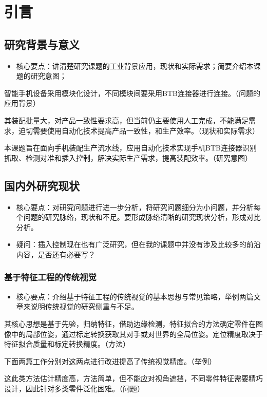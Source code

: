 \documentclass{Diploma}
\begin{document}
\chapter[preface]{引言}
\section{研究背景与意义}
\begin{itemize}
  \item 核心要点：讲清楚研究课题的工业背景应用，现状和实际需求；简要介绍本课题的研究意图；
\end{itemize}

智能手机设备采用模块化设计，不同模块间要采用BTB连接器进行连接。（问题的应用背景）

其装配批量大，对产品一致性要求高，但当前仍主要使用人工完成，不能满足需求，迫切需要使用自动化技术提高产品一致性，和生产效率。（现状和实际需求）

本课题旨在面向手机装配生产流水线，应用自动化技术实现手机BTB连接器识别抓取、检测对准和插入控制，解决实际生产需求，提高装配效率。（研究意图）
\section{国内外研究现状}
\begin{itemize}
  \item 核心要点：对研究问题进行进一步分析，将研究问题细分为小问题，并分析每个问题的研究脉络，现状和不足。要形成脉络清晰的研究现状分析，形成对比分析。
  \item 疑问：插入控制现在也有广泛研究，但在我的课题中并没有涉及比较多的前沿内容，是否还有必要写？
\end{itemize}
\subsection{基于特征工程的传统视觉}
\begin{itemize}
  \item 核心要点：介绍基于特征工程的传统视觉的基本思想与常见策略，举例两篇文章来说明传统视觉的研究侧重与不足。
\end{itemize}

其核心思想是基于先验，归纳特征，借助边缘检测，特征拟合的方法确定零件在图像中的局部位姿，通过标定转换获取其对手或对世界的全局位姿。定位精度取决于特征拟合质量和标定转换精度。（方法）

下面两篇工作分别对这两点进行改进提高了传统视觉精度。（举例）

这此类方法估计精度高，方法简单，但不能应对视角遮挡，不同零件特征需要精巧设计，因此针对多类零件泛化困难。（问题）
\end{document}
